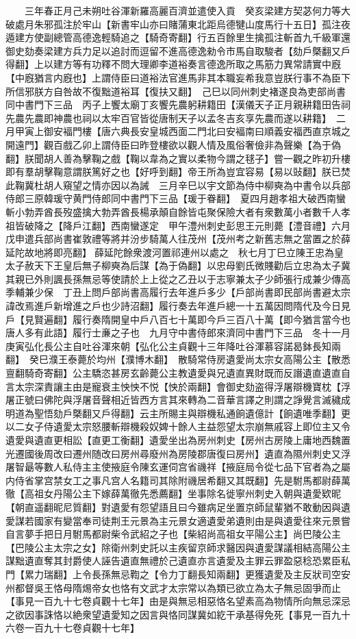 　　三年春正月己未朔吐谷渾新羅高麗百濟並遣使入貢　癸亥梁建方契苾何力等大破處月朱邪孤注於牢山【新書牢山亦曰賭蒲東北距烏德犍山度馬行十五日】孤注夜遁建方使副總管高德逸輕騎追之【騎奇寄翻】行五百餘里生擒孤注斬首九千級軍還御史劾奏梁建方兵力足以追討而逗留不進高德逸勑令市馬自取駿者【劾戶槩翻又戶得翻】上以建方等有功釋不問大理卿李道裕奏言德逸所取之馬筋力異常請實中廐【中廐猶言内廐也】上謂侍臣曰道裕法官進馬非其本職妄希我意豈朕行事不為臣下所信邪朕方自咎故不復黜道裕耳【復扶又翻】　己巳以同州刺史褚遂良為吏部尚書同中書門下三品　丙子上饗太廟丁亥饗先農躬耕籍田【漢儀天子正月親耕籍田告祠先農先農即神農也祠以太牢百官皆從唐制天子以孟冬吉亥享先農而遂以耕籍】　二月甲寅上御安褔門樓【唐六典長安皇城西面二門北曰安褔南曰順義安福西直京城之開遠門】觀百戲乙卯上謂侍臣曰昨登樓欲以觀人情及風俗奢儉非為聲樂【為于偽翻】朕聞胡人善為擊鞠之戲【鞠以韋為之實以柔物今謂之毬子】嘗一觀之昨初升樓即有羣胡擊鞠意謂朕篤好之也【好呼到翻】帝王所為豈宜容易【易以䜴翻】朕已焚此鞠冀杜胡人窺望之情亦因以為誡　三月辛巳以宇文節為侍中柳奭為中書令以兵部侍郎三原韓瑗守黄門侍郎同中書門下三品【瑗于眷翻】　夏四月趙孝祖大破西南蠻斬小勃弄酋長歿盛擒大勃弄酋長楊承顛自餘皆屯聚保險大者有衆數萬小者數千人孝祖皆破降之【降戶江翻】西南蠻遂定　甲午澧州刺史彭思王元則薨【澧音禮】六月戊申遣兵部尚書崔敦禮等將并汾步騎萬人往茂州【茂州考之新舊志無之當置之於薛延陀故地將即亮翻】薛延陀餘衆渡河置祁連州以處之　秋七月丁巳立陳王忠為皇太子赦天下王皇后無子柳奭為后謀【為于偽翻】以忠母劉氏微賤勸后立忠為太子冀其親已外則諷長孫無忌等使請於上上從之乙丑以于志寧兼太子少師張行成兼少傳高季輔兼少保　丁丑上問戶部尚書高履行去年進戶多少【戶部尚書即民部尚書避太宗諱改焉進戶新增進之戶也少詩沼翻】履行奏去年進戶總一十五萬因問隋代及今日見戶【見賢遍翻】履行奏隋開皇中戶八百七十萬即今戶三百八十萬【即今猶言當今也唐人多有此語】履行士亷之子也　九月守中書侍郎來濟同中書門下三品　冬十一月庚寅弘化長公主自吐谷渾來朝【弘化公主貞觀十三年降吐谷渾慕容諾曷鉢長知兩翻】　癸巳濮王泰薨於均州【濮博木翻】　散騎常侍房遺愛尚太宗女高陽公主【散悉亶翻騎奇寄翻】公主驕恣甚房玄齡薨公主教遺愛與兄遺直異財既而反譖遺直遺直自言太宗深責讓主由是寵衰主怏怏不悦【怏於兩翻】會御史劾盗得浮屠辯機寶枕【浮屠正號曰佛陀與浮屠音聲相近皆西方言其來轉為二音華言譯之則謂之諍覺言滅穢成明道為聖悟劾戶槩翻又戶得翻】云主所賜主與辯機私通餉遺億計【餉遺唯季翻】更以二女子侍遺愛太宗怒腰斬辯機殺奴婢十餘人主益怨望太宗崩無戚容上即位主又令遺愛與遺直更相訟【直更工衡翻】遺愛坐出為房州刺史【房州古房陵上庸地西魏置光遷國後周改曰遷州随改曰房州尋廢州為房陵郡唐復曰房州】遺直為隰州刺史又浮屠智朂等數人私侍主主使掖庭令陳玄運伺宫省禨祥【掖庭局令從七品下官者為之屬内侍省掌宫禁女工之事凡宫人名籍司其除附禨居希翻又其既翻】先是駙馬都尉薛萬徹【高祖女丹陽公主下嫁薛萬徹先悉薦翻】坐事除名徙寧州刺史入朝與遺愛欵昵【朝直遥翻昵尼質翻】對遺愛有怨望語且曰今雖病足坐置京師鼠輩猶不敢動因與遺愛謀若國家有變當奉司徒荆王元景為主元景女適遺愛弟遺則由是與遺愛往來元景嘗自言夢手把日月駙馬都尉柴令武紹之子也【柴紹尚高祖女平陽公主】尚巴陵公主【巴陵公主太宗之女】除衛州刺史託以主疾留京師求醫因與遺愛謀議相結高陽公主謀黜遺直奪其封爵使人誣告遺直無禮於己遺直亦言遺愛及主罪云罪盈惡稔恐累臣私門【累力瑞翻】上令長孫無忌鞫之【令力丁翻長知兩翻】更獲遺愛及主反狀司空安州都督吳王恪母隋焬帝女也恪有文武才太宗常以為類已欲立為太子無忌固爭而止【事見一百九十七卷貞觀十七年】由是與無忌相惡恪名望素高為物情所向無忌深忌之欲因事誅恪以絶衆望遺愛知之因言與恪同謀冀如紇干承基得免死【事見一百九十六卷一百九十七卷貞觀十七年】

